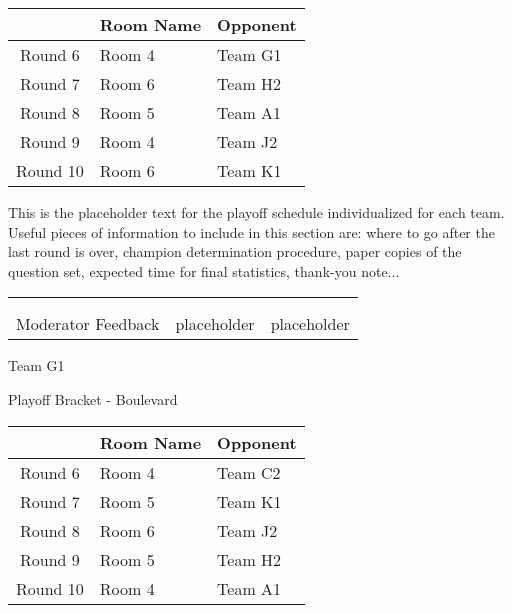 \documentclass{article}%
\begin{document}
\vspace*{4pt}%
%
\begin{tabularx}{\textwidth}{|c|Y|Y|}%
\hline%
&Room Name&Opponent\\%
\hline%
Round 6&Room 4&Team G1\\%
Round 7&Room 6&Team H2\\%
Round 8&Room 5&Team A1\\%
Round 9&Room 4&Team J2\\%
Round 10&Room 6&Team K1\\%
\hline%
\end{tabularx}%
\vspace*{30pt}%
\linebreak%
This is the placeholder text for the playoff schedule individualized for each team. Useful pieces of information to include in this section are: where to go after the last round is over, champion determination procedure, paper copies of the question set, expected time for final statistics, thank{-}you note...%
\vspace*{30pt}%
\newline%
%
\begin{tabularx}{\textwidth}{YYY}%
  &  &  \\%
\\%
Moderator Feedback&placeholder&placeholder\\%
\end{tabularx}%
\newpage%
\begin{center}%
\begin{Huge}%
Team G1%
\end{Huge}%
\vspace*{12pt}%
\linebreak%
\begin{Large}%
Playoff Bracket {-} Boulevard%
\end{Large}%
\end{center}%
\vspace*{4pt}%
%
\begin{tabularx}{\textwidth}{|c|Y|Y|}%
\hline%
&Room Name&Opponent\\%
\hline%
Round 6&Room 4&Team C2\\%
Round 7&Room 5&Team K1\\%
Round 8&Room 6&Team J2\\%
Round 9&Room 5&Team H2\\%
Round 10&Room 4&Team A1\\%
\hline%
\end{tabularx}%
\end{document}
